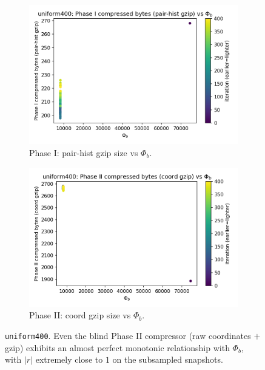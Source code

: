 \documentclass[11pt,a4paper]{article}
\numberwithin{equation}{section}
\newcommand{\phib}{\Phi_b}
\begin{document}
\begin{figure}[h!]
\centering
\begin{subfigure}[b]{0.48\textwidth}
\includegraphics[width=\textwidth]{figures/uniform400_phib_vs_phase1.png}
\caption{Phase I: pair-hist gzip size vs $\phib$.}
\end{subfigure}\hfill
\begin{subfigure}[b]{0.48\textwidth}
\includegraphics[width=\textwidth]{figures/uniform400_phib_vs_phase2.png}
\caption{Phase II: coord gzip size vs $\phib$.}
\end{subfigure}
\caption{\texttt{uniform400}. Even the blind Phase II compressor (raw coordinates $+$ gzip) exhibits an almost perfect monotonic relationship with $\phib$, with $|r|$ extremely close to $1$ on the subsampled snapshots.}
\label{fig:uniform400_corr}
\end{figure}
\end{document}
